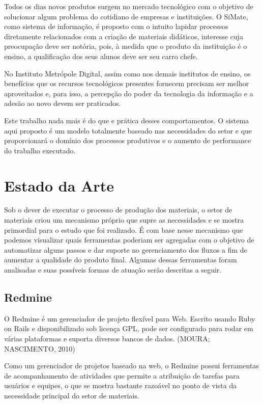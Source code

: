 Todos os dias novos produtos surgem no mercado tecnológico com o objetivo de solucionar algum problema do cotidiano de empresas e instituições. O SiMate, como sistema de informação, é proposto com o intuito lapidar processos diretamente relacionados com a criação de materiais didáticos, interesse cuja preocupação deve ser notória, pois, à medida que o produto da instituição é o ensino, a qualificação dos seus alunos deve ser seu carro chefe.

No Instituto Metrópole Digital, assim como nos demais institutos de ensino, os benefícios que os recursos tecnológicos presentes fornecem precisam ser melhor aproveitados e, para isso, a percepção do poder da tecnologia da informação e a adesão ao novo devem ser praticados. 

Este trabalho nada mais é do que e prática desses comportamentos. O sistema aqui proposto é um modelo totalmente baseado nas necessidades do setor e que proporcionará o domínio dos processos produtivos e o aumento de performance do trabalho executado.

\section{Estado da Arte}

Sob o dever de executar o processo de produção dos materiais, o setor de materiais criou um mecanismo próprio que supre as necessidades e se mostra primordial para o estudo que foi realizado. É com base nesse mecanismo que podemos visualizar quais ferramentas poderiam ser agregadas com o objetivo de automatizar alguns passos e dar suporte no gerenciamento dos fluxos a fim de aumentar a qualidade do produto final. Algumas dessas ferramentas foram analisadas e suas possíveis formas de atuação serão descritas a seguir.

\subsection{Redmine}

O Redmine é um gerenciador de projeto flexível para Web. Escrito usando Ruby on Rails e disponibilizado sob licença GPL, pode ser configurado para rodar em várias plataformas e suporta diversos bancos de dados. (MOURA; NASCIMENTO, 2010)

Como um gerenciador de projetos baseado na web, o Redmine possui ferramentas de acompanhamento de atividades que permite a atribuição de tarefas para usuários e equipes, o que se mostra bastante razoável no ponto de vista da necessidade principal do setor de materiais. 

